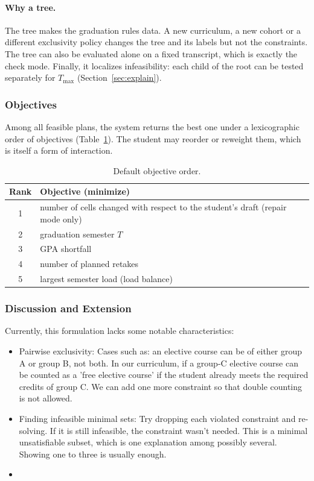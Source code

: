 \documentclass[10pt,a4paper]{article}
\begin{document}
\paragraph{Why a tree.}
The tree makes the graduation rules data. A new curriculum, a new cohort or a
different exclusivity policy changes the tree and its labels but not the
constraints. The tree can also be evaluated alone on a fixed transcript, which
is exactly the check mode. Finally, it localizes infeasibility: each child of
the root can be tested separately for $T_{\max}$
(Section~\ref{sec:explain}).

      \subsubsection{Objectives}\label{sec:objectives}

Among all feasible plans, the system returns the best one under a
lexicographic order of objectives (Table~\ref{tab:objectives}). The student
may reorder or reweight them, which is itself a form of interaction.

\begin{table}[ht]
\centering
\small
\begin{tabular}{@{}cp{11.5cm}@{}}
\toprule
\textbf{Rank} & \textbf{Objective (minimize)} \\
\midrule
1 & number of cells changed with respect to the student's draft (repair mode only) \\
2 & graduation semester $T$ \\
3 & GPA shortfall \\
4 & number of planned retakes \\
5 & largest semester load (load balance) \\
\bottomrule
\end{tabular}
\caption{Default objective order.}
\label{tab:objectives}
\end{table}

      \subsubsection{Discussion and Extension}

Currently, this formulation lacks some notable characteristics:
\begin{itemize}
      \item Pairwise exclusivity: Cases such as: an elective course can be of either group A or group B, not both. In our curriculum, if a group-C elective course can be counted as a 'free elective course' if the student already meets the required credits of group C. We can add one more constraint so that double counting is not allowed.
      \item Finding infeasible minimal sets: Try dropping each violated constraint and re-solving. If it is still infeasible, the constraint wasn’t needed. This is a minimal unsatisfiable subset, which is one explanation among possibly several. Showing one to three is usually enough.
      \item 
\end{itemize}
\end{document}

